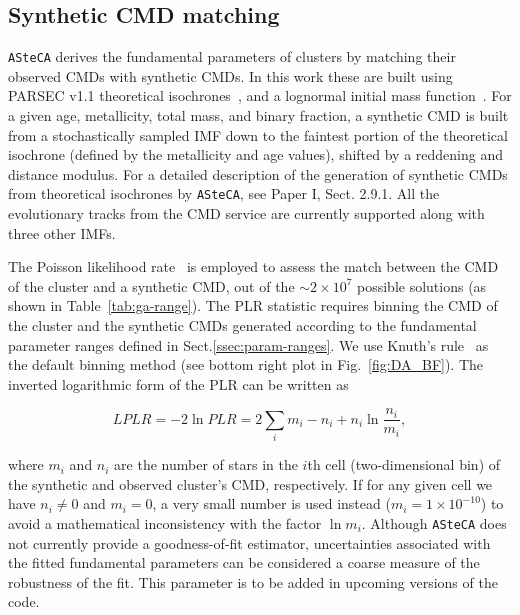 \documentclass{aa}
\begin{document}
\subsection{Synthetic CMD matching}
\label{ssec:synth-match}

\texttt{ASteCA} derives the fundamental parameters of clusters by matching their observed
CMDs with synthetic CMDs. In this work these are built using PARSEC v1.1
theoretical isochrones~\citep[][B12]{Bressan_2012},
and a lognormal initial mass function~\citep[IMF;][]{Chabrier_2001}.
%
For a given age, metallicity, total mass, and binary fraction, a
synthetic CMD is built from a stochastically sampled IMF down to the
faintest portion of the theoretical isochrone (defined by the metallicity and
age values), shifted by a reddening and distance modulus. For a detailed
description of the generation of synthetic CMDs from theoretical
isochrones by \texttt{ASteCA}, see Paper I, Sect. 2.9.1. All the evolutionary
tracks from the CMD service are currently supported along with three other IMFs.

The Poisson likelihood rate~\citep[PLR;][]{Dolphin_2002} is employed
to assess the match between the CMD of the cluster and a synthetic
CMD, out of the ${\sim}2{\times}10^7$ possible solutions (as shown in
Table~\ref{tab:ga-range}).
The PLR statistic requires binning the CMD of the cluster and the synthetic CMDs
generated according to the fundamental parameter ranges defined in
Sect.\ref{ssec:param-ranges}.
We use Knuth's rule~\citep[][also implemented via the astroML package]
{Knuth_2006} as the default binning method (see bottom right plot in
Fig.~\ref{fig:DA_BF}).
The inverted logarithmic form of the PLR can be written as

\begin{equation}
LPLR  = -2 \ln PLR = 2 \sum_i m_i - n_i + n_i \ln \frac{n_i}{m_i},
\label{eq:likelihood}
\end{equation}

\noindent where $m_i$ and $n_i$ are the number of stars in the $i$th cell
(two-dimensional bin) of the synthetic and  observed cluster's CMD,
respectively. If for any given cell we have $n_i\neq0$ and $m_i=0$, a
very small number is used instead ($m_i=1{\times}10^{-10}$) to avoid a
mathematical inconsistency with the factor $\ln m_i$.
Although \texttt{ASteCA} does not currently provide a goodness-of-fit
estimator, uncertainties associated with the fitted fundamental parameters
can be considered a coarse measure of the robustness of the fit. This parameter is
to be added in upcoming versions of the code.
\end{document}
